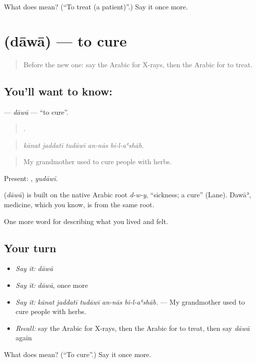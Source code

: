 \begin{tcolorbox}[breakable,colback=teal!4,colframe=teal!35!black,title={Before you move on}]
What does  mean? (\textquotedblleft{}To treat (a patient)\textquotedblright{}.) Say it once more.
\end{tcolorbox}
\section[\texorpdfstring{\ar{داوى} (dāwā)}{داوى (dāwā)}]{ (dāwā) — to cure}

\label{lesson:AR-C510-dawa}



\begin{quote}
Before the new one: say the Arabic for X-rays, then the Arabic for to treat.
\end{quote}

\subsection*{You'll want to know: }
\textbf{} — \emph{dāwā} — \textquotedblleft{}to cure\textquotedblright{}.

\begin{quote}
    .
\end{quote}

\begin{quote}
\emph{kānat jaddatī tudāwī an-nās bi-l-aʿshāb.}
\end{quote}

\begin{quote}
My grandmother used to cure people with herbs.
\end{quote}

Present: , \emph{yudāwī}.

\begin{cousinweb}
\textbf{} (\emph{dāwā}) is built on the native Arabic root \emph{d-w-y}, \textquotedblleft{}sickness; a cure\textquotedblright{} (Lane). Dawāʾ, medicine, which you know, is from the same root.
\end{cousinweb}

\begin{grammarlens}[title={What you've built}]
One more word for describing what you lived and felt.
\end{grammarlens}

\subsection*{Your turn}
\begin{itemize}
\raggedright
  \item \emph{Say it:} \emph{dāwā}
  \item \emph{Say it:} \emph{dāwā}, once more
  \item \emph{Say it:} \emph{kānat jaddatī tudāwī an-nās bi-l-aʿshāb.} — My grandmother used to cure people with herbs.
  \item \emph{Recall:} say the Arabic for X-rays, then the Arabic for to treat, then say \emph{dāwā} again
\end{itemize}

\begin{tcolorbox}[breakable,colback=teal!4,colframe=teal!35!black,title={Before you move on}]
What does  mean? (\textquotedblleft{}To cure\textquotedblright{}.) Say it once more.
\end{tcolorbox}

